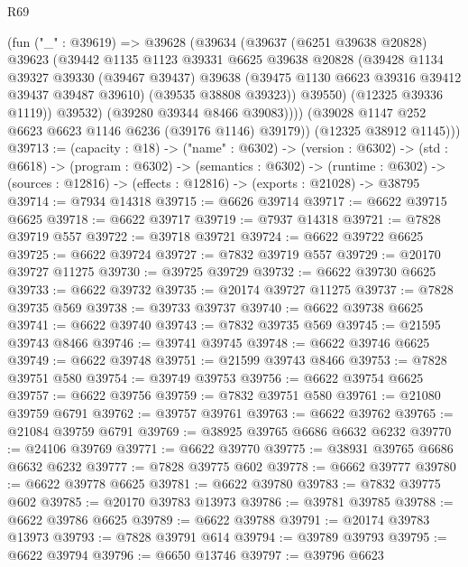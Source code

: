 \begin{lexlean}{R69}
\begin{coremodule}
{              (fun ("_" : @39619) =>
              @39628
                (@39634
                  (@39637
                    (@6251 @39638 @20828)
                    @39623
                    (@39442
                      @1135
                      @1123
                      @39331
                      @6625
                      @39638
                      @20828
                      (@39428
                        @1134
                        @39327
                        @39330
                        (@39467 @39437)
                        @39638
                        (@39475 @1130 @6623 @39316 @39412 @39437 @39487 @39610)
                        (@39535 @38808 @39323))
                      @39550)
                    (@12325 @39336 @1119))
                  @39532)
                (@39280 @39344 @8466 @39083))))
          (@39028 @1147 @252 @6623 @6623 @1146 @6236 (@39176 @1146) @39179))
        (@12325 @38912 @1145)))
@39713 := (capacity : @18) ->
  ("name" : @6302) ->
  (version : @6302) ->
  (std : @6618) ->
  (program : @6302) ->
  (semantics : @6302) ->
  (runtime : @6302) -> (sources : @12816) -> (effects : @12816) -> (exports : @21028) -> @38795
@39714 := @7934 @14318
@39715 := @6626 @39714
@39717 := @6622 @39715 @6625
@39718 := @6622 @39717
@39719 := @7937 @14318
@39721 := @7828 @39719 @557
@39722 := @39718 @39721
@39724 := @6622 @39722 @6625
@39725 := @6622 @39724
@39727 := @7832 @39719 @557
@39729 := @20170 @39727 @11275
@39730 := @39725 @39729
@39732 := @6622 @39730 @6625
@39733 := @6622 @39732
@39735 := @20174 @39727 @11275
@39737 := @7828 @39735 @569
@39738 := @39733 @39737
@39740 := @6622 @39738 @6625
@39741 := @6622 @39740
@39743 := @7832 @39735 @569
@39745 := @21595 @39743 @8466
@39746 := @39741 @39745
@39748 := @6622 @39746 @6625
@39749 := @6622 @39748
@39751 := @21599 @39743 @8466
@39753 := @7828 @39751 @580
@39754 := @39749 @39753
@39756 := @6622 @39754 @6625
@39757 := @6622 @39756
@39759 := @7832 @39751 @580
@39761 := @21080 @39759 @6791
@39762 := @39757 @39761
@39763 := @6622 @39762
@39765 := @21084 @39759 @6791
@39769 := @38925 @39765 @6686 @6632 @6232
@39770 := @24106 @39769
@39771 := @6622 @39770
@39775 := @38931 @39765 @6686 @6632 @6232
@39777 := @7828 @39775 @602
@39778 := @6662 @39777
@39780 := @6622 @39778 @6625
@39781 := @6622 @39780
@39783 := @7832 @39775 @602
@39785 := @20170 @39783 @13973
@39786 := @39781 @39785
@39788 := @6622 @39786 @6625
@39789 := @6622 @39788
@39791 := @20174 @39783 @13973
@39793 := @7828 @39791 @614
@39794 := @39789 @39793
@39795 := @6622 @39794
@39796 := @6650 @13746
@39797 := @39796 @6623
}
\end{coremodule}
\end{lexlean}

